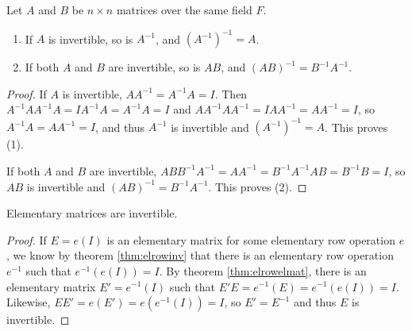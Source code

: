 \documentclass[12pt]{article}
\begin{document}
\begin{thm} \label{thm:ifinvertsoinv}
  Let $A$ and $B$ be $n \times n$ matrices over the same field
  $F$.
  \begin{enumerate}
    \item If $A$ is invertible, so is $A^{-1}$, and $(A^{-1})^{-1}
      = A$.
    \item If both $A$ and $B$ are invertible, so is $AB$, and
      $(AB)^{-1} = B^{-1}A^{-1}$.
  \end{enumerate}

  \begin{proof}
    If $A$ is invertible, $AA^{-1} = A^{-1}A = I$. Then
    $A^{-1}AA^{-1}A = IA^{-1}A = A^{-1}A = I$ and
    $AA^{-1}AA^{-1} = IAA^{-1} = AA^{-1} = I$, so $A^{-1}A =
    AA^{-1} = I$, and thus $A^{-1}$ is invertible and
    $(A^{-1})^{-1} = A$. This proves (1).

    If both $A$ and $B$ are invertible, $ABB^{-1}A^{-1} = AA^{-1}
    = B^{-1}A^{-1}AB = B^{-1}B = I$, so $AB$ is invertible and
    $(AB)^{-1} = B^{-1}A^{-1}$. This proves (2).
  \end{proof}
\end{thm}

\begin{thm} \label{thm:elmatsareinv}
  Elementary matrices are invertible.

  \begin{proof}
    If $E = e(I)$ is an elementary matrix for some elementary row
    operation $e$, we know by theorem \ref{thm:elrowinv} that
    there is an elementary row operation $e^{-1}$ such that
    $e^{-1}(e(I)) = I$. By theorem \ref{thm:elrowelmat}, there is
    an elementary matrix $E' = e^{-1}(I)$ such that $E'E =
    e^{-1}(E) = e^{-1}(e(I)) = I$. Likewise, $EE' = e(E') =
    e(e^{-1}(I)) = I$, so $E' = E^{-1}$ and thus $E$ is
    invertible.
  \end{proof}
\end{thm}
\end{document}
